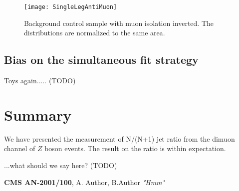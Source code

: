 \documentclass{cmspaper}
\begin{document}
\begin{figure}[hbtp]
\begin{center}
\texttt{[image: SingleLegAntiMuon]}
\caption{Background control sample with muon isolation inverted.  The distributions are normalized to the same area.}
\label{Figure_AntiMuonSingleLeg}
\end{center}
\end{figure}

\subsection{Bias on the simultaneous fit strategy}

Toys again.....  (TODO)

\section{Summary}

We have presented the measurement of N/(N+1) jet ratio from the dimuon
channel of $Z$ boson events.  The result on the ratio is within
expectation.

...what should we say here?  (TODO)


\begin{thebibliography}{9}
    {\bf CMS AN-2001/100},
      A. Author, B.Author
      {\em "Hmm"}
\end{thebibliography}
 
\pagebreak
\end{document}
